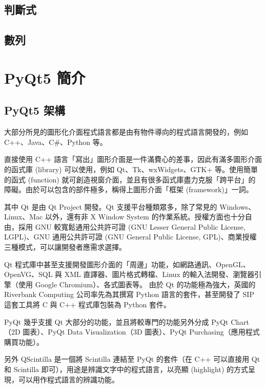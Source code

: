 \documentclass[12pt,,]{report}
\begin{document}
\hypertarget{ux5224ux65b7ux5f0f}{%
\section{判斷式}\label{ux5224ux65b7ux5f0f}}

\hypertarget{ux6578ux5217}{%
\section{數列}\label{ux6578ux5217}}

\hypertarget{pyqt5-ux7c21ux4ecb}{%
\chapter{PyQt5 簡介}\label{pyqt5-ux7c21ux4ecb}}

\hypertarget{pyqt5-ux67b6ux69cb}{%
\section{PyQt5 架構}\label{pyqt5-ux67b6ux69cb}}

大部分所見的圖形化介面程式語言都是由有物件導向的程式語言開發的，例如
C++、Java、C\#、Python 等。

直接使用 C++
語言「寫出」圖形介面是一件滿費心的差事，因此有滿多圖形介面的函式庫
(library) 可以使用，例如 Qt、Tk、wxWidgets、GTK+ 等。使用簡單的函式
(function)
就可創造視窗介面，並且有很多函式庫盡力克服「跨平台」的障礙。由於可以包含的部件極多，稱得上圖形介面「框架
(framework)」一詞。

其中 Qt 是由 Qt Project 開發。Qt 支援平台種類眾多，除了常見的
Windows、Linux、Mac 以外，還有非 X Window System
的作業系統。授權方面也十分自由，採用 GNU 較寬鬆通用公共許可證 (GNU
Lesser General Public License, LGPL)、GNU 通用公共許可證 (GNU General
Public License, GPL)、商業授權三種模式，可以讓開發者應需求選擇。

Qt
程式庫中甚至支援開發圖形介面的「周邊」功能，如網路通訊、OpenGL、OpenVG、SQL
與 XML 直譯器、圖片格式轉檔、Linux 的輸入法開發、瀏覽器引擎（使用 Google
Chromium）、各式圖表等。 由於 Qt 的功能極為強大，英國的 Riverbank
Computing 公司率先為其撰寫 Python 語言的套件，甚至開發了 SIP 這套工具將
C 與 C++ 程式庫包裝為 Python 套件。

PyQt 幾乎支援 Qt 大部分的功能，並且將較專門的功能另外分成 PyQt Chart（2D
圖表）、PyQt Data Visualization（3D 圖表）、PyQt
Purchasing（應用程式購買功能）。

另外 QScintilla 是一個將 Scintilla 連結至 PyQt 的套件（在 C++ 可以直接用
Qt 和 Scintilla 即可），用途是辨識文字中的程式語言，以亮顯 (highlight)
的方式呈現，可以用作程式語言的辨識功能。
\end{document}
